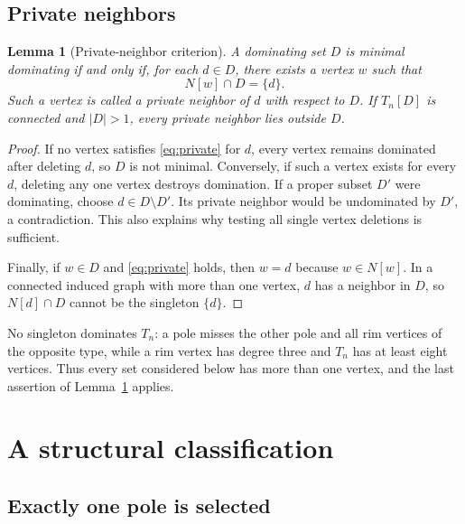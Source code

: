 \documentclass[11pt,letterpaper]{article}
\numberwithin{equation}{section}
\newtheorem{lemma}[theorem]{Lemma}
\theoremstyle{definition}
\theoremstyle{remark}
\begin{document}
\subsection{Private neighbors}

\begin{lemma}[Private-neighbor criterion]\label{lem:private}
A dominating set $D$ is minimal dominating if and only if, for each
$d\in D$, there exists a vertex $w$ such that
\begin{equation}\label{eq:private}
 N[w]\cap D=\{d\}.
\end{equation}
Such a vertex is called a \emph{private neighbor} of $d$ with respect
to $D$. If $T_n[D]$ is connected and $|D|>1$, every private neighbor
lies outside $D$.
\end{lemma}
\begin{proof}
If no vertex satisfies \eqref{eq:private} for $d$, every vertex
remains dominated after deleting $d$, so $D$ is not minimal. Conversely,
if such a vertex exists for every $d$, deleting any one vertex destroys
domination. If a proper subset $D'$ were dominating, choose
$d\in D\setminus D'$. Its private neighbor would be undominated by
$D'$, a contradiction. This also explains why testing all single
vertex deletions is sufficient.

Finally, if $w\in D$ and \eqref{eq:private} holds, then $w=d$ because
$w\in N[w]$. In a connected induced graph with more than one vertex,
$d$ has a neighbor in $D$, so $N[d]\cap D$ cannot be the singleton
$\{d\}$.
\end{proof}

No singleton dominates $T_n$: a pole misses the other pole and all
rim vertices of the opposite type, while a rim vertex has degree
three and $T_n$ has at least eight vertices. Thus every set considered
below has more than one vertex, and the last assertion of
Lemma~\ref{lem:private} applies.

\section{A structural classification}\label{sec:classification}

\subsection{Exactly one pole is selected}
\end{document}
